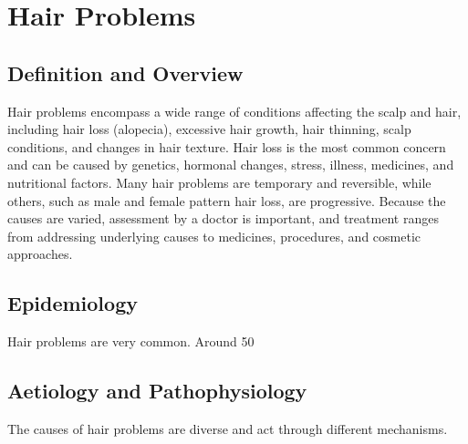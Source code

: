 \chapter{Hair Problems}

\section*{Definition and Overview}
Hair problems encompass a wide range of conditions affecting the scalp and hair, including hair loss (alopecia), excessive hair growth, hair thinning, scalp conditions, and changes in hair texture. Hair loss is the most common concern and can be caused by genetics, hormonal changes, stress, illness, medicines, and nutritional factors. Many hair problems are temporary and reversible, while others, such as male and female pattern hair loss, are progressive. Because the causes are varied, assessment by a doctor is important, and treatment ranges from addressing underlying causes to medicines, procedures, and cosmetic approaches.

\section*{Epidemiology}
Hair problems are very common. Around 50%

\section*{Aetiology and Pathophysiology}
The causes of hair problems are diverse and act through different mechanisms.

